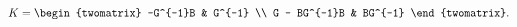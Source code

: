 \begin{equation}
\label{eq:K}
  K = \begin{twomatrix}
          -G^{-1}B   &  G^{-1} \\
        G - BG^{-1}B & BG^{-1}
      \end{twomatrix}.
\end{equation}

